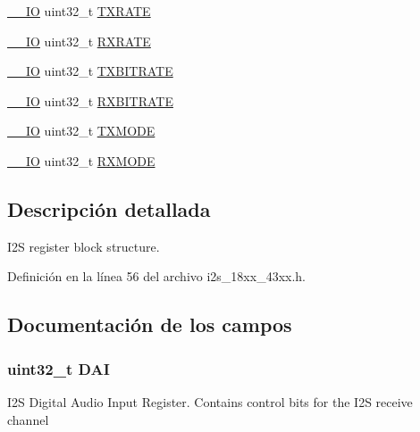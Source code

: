 \begin{DoxyCompactItemize}
\item 
\hyperlink{core__sc300_8h_aec43007d9998a0a0e01faede4133d6be}{\+\_\+\+\_\+\+IO} uint32\+\_\+t \hyperlink{struct_l_p_c___i2_s___t_ac9bd66e9b642f40484f2ac314f51ba06}{T\+X\+R\+A\+TE}
\item 
\hyperlink{core__sc300_8h_aec43007d9998a0a0e01faede4133d6be}{\+\_\+\+\_\+\+IO} uint32\+\_\+t \hyperlink{struct_l_p_c___i2_s___t_a1c3274d93523a3c6edfbfc8625b4e9f9}{R\+X\+R\+A\+TE}
\item 
\hyperlink{core__sc300_8h_aec43007d9998a0a0e01faede4133d6be}{\+\_\+\+\_\+\+IO} uint32\+\_\+t \hyperlink{struct_l_p_c___i2_s___t_a397223cebffbdcceb4b774587e0dcf58}{T\+X\+B\+I\+T\+R\+A\+TE}
\item 
\hyperlink{core__sc300_8h_aec43007d9998a0a0e01faede4133d6be}{\+\_\+\+\_\+\+IO} uint32\+\_\+t \hyperlink{struct_l_p_c___i2_s___t_a2c446eeb84edc6509a4dc907fb651e10}{R\+X\+B\+I\+T\+R\+A\+TE}
\item 
\hyperlink{core__sc300_8h_aec43007d9998a0a0e01faede4133d6be}{\+\_\+\+\_\+\+IO} uint32\+\_\+t \hyperlink{struct_l_p_c___i2_s___t_a0f90530813c0449c4e78252fe9f00a24}{T\+X\+M\+O\+DE}
\item 
\hyperlink{core__sc300_8h_aec43007d9998a0a0e01faede4133d6be}{\+\_\+\+\_\+\+IO} uint32\+\_\+t \hyperlink{struct_l_p_c___i2_s___t_a9ce107cf8f0a1415501724ee6d607af8}{R\+X\+M\+O\+DE}
\end{DoxyCompactItemize}


\subsection{Descripción detallada}
I2S register block structure. 

Definición en la línea 56 del archivo i2s\+\_\+18xx\+\_\+43xx.\+h.



\subsection{Documentación de los campos}
\subsubsection[{\texorpdfstring{D\+AI}{DAI}}]{ uint32\+\_\+t D\+AI}\hypertarget{struct_l_p_c___i2_s___t_a3181fde20c2b3e5250a1b776aed89b0b}{}\label{struct_l_p_c___i2_s___t_a3181fde20c2b3e5250a1b776aed89b0b}
I2S Digital Audio Input Register. Contains control bits for the I2S receive channel 

